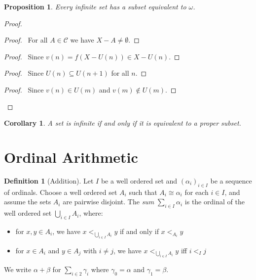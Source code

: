 \documentclass{report}
\let\qed\relax
\newtheorem{prop}[ax]{Proposition}
\newtheorem{cor}{Corollary}[ax]
\theoremstyle{definition}
\newtheorem{df}[ax]{Definition}
\newcommand{\dom}{\ensuremath{\operatorname{dom}}}
\begin{document}
\begin{prop}
Every infinite set has a subset equivalent to $\omega$.
\end{prop}

\begin{proof}
\pf
{}
\step{4}{For all $A \in \mathcal{C}$ we have $X - A \in \dom f$.}
\begin{proof}
	\pf\ For all $A \in \mathcal{C}$ we have $X - A \neq \emptyset$.
\end{proof}
\begin{proof}
	\pf\ Since $v(n) = f(X - U(n)) \in X - U(n)$.
\end{proof}
\begin{proof}
	\pf\ Since $U(n) \subseteq U(n+1)$ for all $n$.
\end{proof}
\begin{proof}
	\pf\ Since $v(n) \in U(m)$ and $v(m) \notin U(m)$.
\end{proof}
\qed
\end{proof}

\begin{cor}
A set is infinite if and only if it is equivalent to a proper subset.
\end{cor}

\section{Ordinal Arithmetic}

\begin{df}[Addition]
Let $I$ be a well ordered set and $(\alpha_i)_{i \in I}$ be a sequence of ordinals. Choose a well ordered set $A_i$ such that $A_i \cong \alpha_i$ for each $i \in I$, and assume the sets $A_i$ are pairwise disjoint. The \emph{sum} $\sum_{i \in I} \alpha_i$ is the ordinal of the well ordered set $\bigcup_{i \in I} A_i$, where:
\begin{itemize}
\item for $x,y \in A_i$, we have $x <_{\bigcup_{i \in I} A_i} y$ if and only if $x <_{A_i} y$
\item for $x \in A_i$ and $y \in A_j$ with $i \neq j$, we have $x <_{\bigcup_{i \in I} A_i} y$ iff $i <_I j$
\end{itemize}

We write $\alpha + \beta$ for $\sum_{i \in 2} \gamma_i$ where $\gamma_0 = \alpha$ and $\gamma_1 = \beta$.
\end{df}
\end{document}
